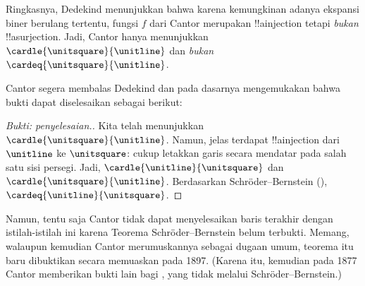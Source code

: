 \documentclass[../../../include/open-logic-section]{subfiles}
\begin{document}
Ringkasnya, Dedekind menunjukkan bahwa karena kemungkinan adanya ekspansi
biner berulang tertentu, fungsi $f$ dari Cantor merupakan !!a{injection}
tetapi \emph{bukan} !!a{surjection}. Jadi, Cantor hanya menunjukkan
$\cardle{\unitsquare}{\unitline}$ dan \emph{bukan}
$\cardeq{\unitsquare}{\unitline}$.

Cantor segera membalas Dedekind dan pada dasarnya mengemukakan bahwa bukti
dapat diselesaikan sebagai berikut:

\begin{proof}[Bukti: penyelesaian.]
Kita telah menunjukkan $\cardle{\unitsquare}{\unitline}$. Namun, jelas
terdapat !!a{injection} dari $\unitline$ ke $\unitsquare$: cukup letakkan
garis secara mendatar pada salah satu sisi persegi. Jadi,
$\cardle{\unitline}{\unitsquare}$ dan
$\cardle{\unitsquare}{\unitline}$. Berdasarkan
Schr\"{o}der--Bernstein
(),
$\cardeq{\unitline}{\unitsquare}$.
\end{proof}

Namun, tentu saja Cantor tidak dapat menyelesaikan baris terakhir dengan
istilah-istilah ini karena Teorema Schr\"{o}der--Bernstein belum terbukti.
Memang, walaupun kemudian Cantor merumuskannya sebagai dugaan umum, teorema
itu baru dibuktikan secara memuaskan pada 1897. (Karena itu, kemudian pada
1877 Cantor memberikan bukti lain bagi , yang tidak
melalui Schr\"{o}der--Bernstein.)
\end{document}
